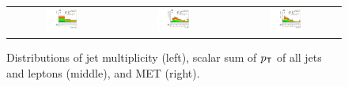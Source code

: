 \begin{figure}[tbh!]
 \begin{center}
 \begin{tabular}{ccc}
  \includegraphics[width=0.325\textwidth]{figures/Appendix/SRMC/njet}&
    \includegraphics[width=0.325\textwidth]{figures/Appendix/SRMC/Ht}&
  \includegraphics[width=0.325\textwidth]{figures/Appendix/SRMC/Met}\\
 \end{tabular}
 \caption{Distributions of jet multiplicity (left), scalar sum of $p_{\textsf{T}}$ of all jets and leptons (middle), and \ac{MET} (right).}
 \label{fig:input_vali_4}
 \end{center}
\end{figure}


